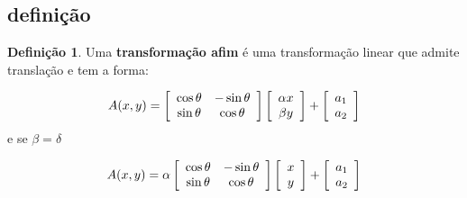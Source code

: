 \documentclass[12pt]{report}
\theoremstyle{definition}
\newtheorem{definition}{Definição}
\begin{document}
\subsection{definição}

\begin{definition}

Uma \textbf{transformação afim} é uma transformação linear que admite translação e tem a forma:

\end{definition}

\begin{equation}
    A(x, y) = 
    \left[ 
    {
        \begin{array}{c c}
            \cos{\theta} & -\sin{\theta} \\
            \sin{\theta} &  \cos{\theta} \\
        \end{array} 
    } 
    \right]
    \left[ 
    {
        \begin{array}{c}
            \alpha  x \\
            \beta   y \\
        \end{array} 
        } 
    \right]
    +
    \left[ 
    {
        \begin{array}{c}
            a_1 \\ 
            a_2 \\
        \end{array} 
    } 
    \right]
\end{equation}
e se \( \beta = \delta\)

\begin{equation}
    A(x, y) =
    \alpha
    \left[ 
    {
        \begin{array}{c c}
            \cos{\theta} & -\sin{\theta} \\
            \sin{\theta} &  \cos{\theta} \\
        \end{array} 
    } 
    \right]
    \left[ 
    {
        \begin{array}{c}
            x \\
            y \\
        \end{array} 
        } 
    \right]
    +
    \left[ 
    {
        \begin{array}{c}
            a_1 \\ 
            a_2 \\
        \end{array} 
    } 
    \right]
\end{equation}
\end{document}

